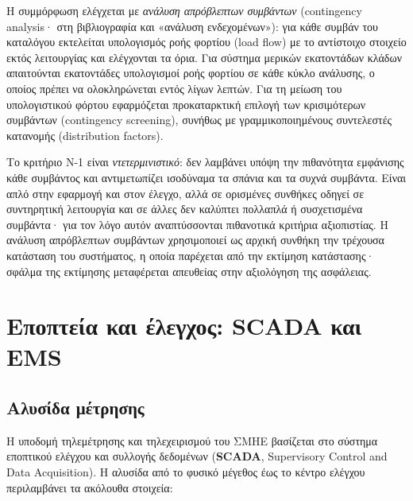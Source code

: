 Η συμμόρφωση ελέγχεται με \emph{ανάλυση απρόβλεπτων συμβάντων} (contingency analysis· στη
βιβλιογραφία και «ανάλυση ενδεχομένων»): για κάθε συμβάν του καταλόγου εκτελείται
υπολογισμός ροής φορτίου (load flow) με το αντίστοιχο στοιχείο εκτός λειτουργίας και
ελέγχονται τα όρια. Για σύστημα μερικών εκατοντάδων κλάδων απαιτούνται εκατοντάδες
υπολογισμοί ροής φορτίου σε κάθε κύκλο ανάλυσης, ο οποίος πρέπει να ολοκληρώνεται εντός
λίγων λεπτών. Για τη μείωση του υπολογιστικού φόρτου εφαρμόζεται προκαταρκτική επιλογή των
κρισιμότερων συμβάντων (contingency screening), συνήθως με γραμμικοποιημένους συντελεστές
κατανομής (distribution factors).

Το κριτήριο N-1 είναι \emph{ντετερμινιστικό}: δεν λαμβάνει υπόψη την πιθανότητα εμφάνισης
κάθε συμβάντος και αντιμετωπίζει ισοδύναμα τα σπάνια και τα συχνά συμβάντα. Είναι απλό στην
εφαρμογή και στον έλεγχο, αλλά σε ορισμένες συνθήκες οδηγεί σε συντηρητική λειτουργία και σε
άλλες δεν καλύπτει πολλαπλά ή συσχετισμένα συμβάντα· για τον λόγο αυτόν αναπτύσσονται
πιθανοτικά κριτήρια αξιοπιστίας. Η ανάλυση απρόβλεπτων συμβάντων χρησιμοποιεί ως αρχική
συνθήκη την τρέχουσα κατάσταση του συστήματος, η οποία παρέχεται από την εκτίμηση
κατάστασης· σφάλμα της εκτίμησης μεταφέρεται απευθείας στην αξιολόγηση της ασφάλειας.

\section{Εποπτεία και έλεγχος: SCADA και EMS}

\subsection{Αλυσίδα μέτρησης}

Η υποδομή τηλεμέτρησης και τηλεχειρισμού του ΣΜΗΕ βασίζεται στο σύστημα εποπτικού ελέγχου
και συλλογής δεδομένων (\textbf{SCADA}, Supervisory Control and Data Acquisition). Η αλυσίδα
από το φυσικό μέγεθος έως το κέντρο ελέγχου περιλαμβάνει τα ακόλουθα στοιχεία:

